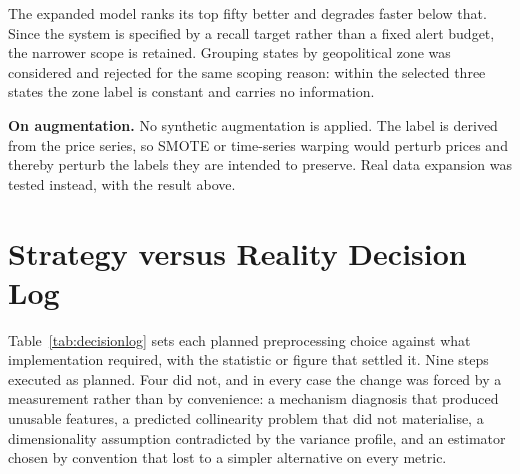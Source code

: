 \documentclass[conference]{IEEEtran}
\begin{document}
The expanded model ranks its top fifty better and degrades faster below that.
Since the system is specified by a recall target rather than a fixed alert
budget, the narrower scope is retained. Grouping states by geopolitical zone
was considered and rejected for the same scoping reason: within the selected
three states the zone label is constant and carries no information.

\textbf{On augmentation.} No synthetic augmentation is applied. The label is
derived from the price series, so SMOTE or time-series warping would perturb
prices and thereby perturb the labels they are intended to preserve. Real
data expansion was tested instead, with the result above.

\clearpage
\section{Strategy versus Reality Decision Log}
\label{sec:log}

Table~\ref{tab:decisionlog} sets each planned preprocessing choice against
what implementation required, with the statistic or figure that settled it.
Nine steps executed as planned. Four did not, and in every case the change was
forced by a measurement rather than by convenience: a mechanism diagnosis that
produced unusable features, a predicted collinearity problem that did not
materialise, a dimensionality assumption contradicted by the variance profile,
and an estimator chosen by convention that lost to a simpler alternative on
every metric.
\end{document}
